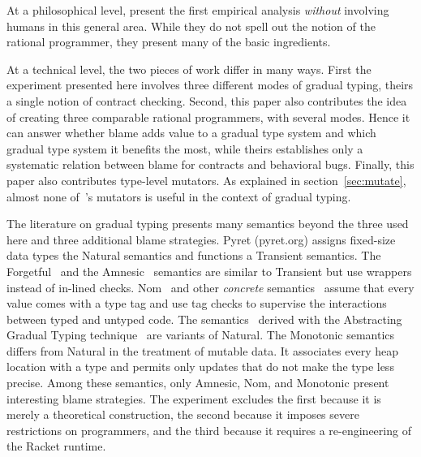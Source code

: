 
At a philosophical level, \citet{lksfd-popl-2020} present the first empirical
analysis {\em without\/} involving humans in this general area.  While they do
not spell out the notion of the rational programmer, they present many of the
basic ingredients.

At a technical level, the two pieces of work differ in many ways.  First the
experiment presented here involves three different modes of gradual typing,
theirs a single notion of contract checking.  Second, this paper also
contributes the idea of creating three comparable rational programmers, with
several modes. Hence it can answer whether blame adds value to a gradual type
system and which gradual type system it benefits the most, while theirs
establishes only a systematic relation between blame for contracts and
behavioral bugs. Finally, this paper also contributes type-level mutators. As
explained in section~\ref{sec:mutate}, almost none of~\citet{lksfd-popl-2020}'s
mutators is useful in the context of gradual typing. 

The literature on gradual typing presents many semantics beyond the three used
here and three additional blame strategies.  Pyret (pyret.org) assigns fixed-size
data types the Natural semantics and functions a Transient semantics. The
Forgetful~\citep{cl-icfp-2017} and the Amnesic~\citep{gfd-oopsla-2019} semantics
are similar to Transient but use wrappers instead of in-lined checks.
Nom~\citep{mt-oopsla-2017} and other \emph{concrete\/}
semantics~\citep{wnlov-popl-2010, rsfbv-popl-2015, rzv-ecoop-2015,
rat-oopsla-2017} assume that every value comes with a type tag and use tag
checks to supervise the interactions between typed and untyped code.  The semantics~\citep{tlt-popl-2019,
etg-icfp-19, tt-scp-20, tgt-popl-18, tt-sas-17} derived with the Abstracting
Gradual Typing technique~\citep{gct-popl-2016} are variants of Natural.
The Monotonic semantics~\citep{svctg-esop-2015, rsfbv-popl-2015, sfrbcsb-popl-2014, kas-pldi-2019} 
differs from Natural in the treatment of mutable data. It 
associates every heap location with a type and permits only updates that 
do not make the type less precise.  
Among these semantics, only Amnesic, Nom, and Monotonic present interesting blame
strategies.  The experiment excludes the first because it is 
merely a theoretical construction, the second because it imposes severe restrictions on
programmers, and the third because it requires a re-engineering of the Racket runtime. 
